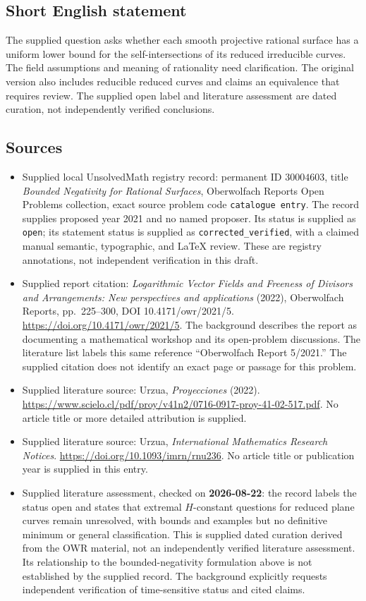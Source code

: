 \documentclass[11pt]{article}
\begin{document}
\subsection{Short English statement}
The supplied question asks whether each smooth projective rational surface has a uniform lower bound for the self-intersections of its reduced irreducible curves. The field assumptions and meaning of rationality need clarification. The original version also includes reducible reduced curves and claims an equivalence that requires review. The supplied open label and literature assessment are dated curation, not independently verified conclusions.
\subsection{Sources}
\begin{itemize}
\item Supplied local UnsolvedMath registry record: permanent ID \(30004603\), title \emph{Bounded Negativity for Rational Surfaces}, Oberwolfach Reports Open Problems collection, exact source problem code \texttt{catalogue entry}. The record supplies proposed year 2021 and no named proposer. Its status is supplied as \texttt{open}; its statement status is supplied as \texttt{corrected\_verified}, with a claimed manual semantic, typographic, and LaTeX review. These are registry annotations, not independent verification in this draft.
\item Supplied report citation: \emph{Logarithmic Vector Fields and Freeness of Divisors and Arrangements: New perspectives and applications} (2022), Oberwolfach Reports, pp.\ 225--300, DOI 10.4171/owr/2021/5. \url{https://doi.org/10.4171/owr/2021/5}. The background describes the report as documenting a mathematical workshop and its open-problem discussions. The literature list labels this same reference ``Oberwolfach Report 5/2021.'' The supplied citation does not identify an exact page or passage for this problem.
\item Supplied literature source: Urzua, \emph{Proyecciones} (2022). \url{https://www.scielo.cl/pdf/proy/v41n2/0716-0917-proy-41-02-517.pdf}. No article title or more detailed attribution is supplied.
\item Supplied literature source: Urzua, \emph{International Mathematics Research Notices}. \url{https://doi.org/10.1093/imrn/rnu236}. No article title or publication year is supplied in this entry.
\item Supplied literature assessment, checked on \textbf{2026-08-22}: the record labels the status open and states that extremal \(H\)-constant questions for reduced plane curves remain unresolved, with bounds and examples but no definitive minimum or general classification. This is supplied dated curation derived from the OWR material, not an independently verified literature assessment. Its relationship to the bounded-negativity formulation above is not established by the supplied record. The background explicitly requests independent verification of time-sensitive status and cited claims.
\end{itemize}
\end{document}

